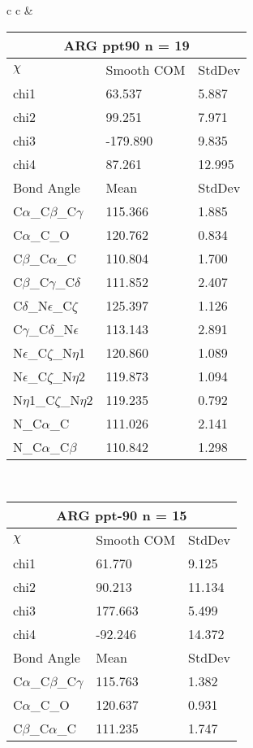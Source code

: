 \begin{longtable}{ c c }
  &
  \begin{tabular}{ l l l }
  \toprule
  \multicolumn{3}{c}{ARG \textbf{ppt90} n = 19} \\ \toprule
  $\chi$       & Smooth COM & StdDev \\ \midrule
  chi1 & 63.537 & 5.887 \\ 
  chi2 & 99.251 & 7.971 \\ 
  chi3 & -179.890 & 9.835 \\ 
  chi4 & 87.261 & 12.995 \\ \midrule
  Bond Angle   & Mean     & StdDev \\ \midrule
  C$\alpha$\_C$\beta$\_C$\gamma$ & 115.366 & 1.885\\
  C$\alpha$\_C\_O & 120.762 & 0.834\\
  C$\beta$\_C$\alpha$\_C & 110.804 & 1.700\\
  C$\beta$\_C$\gamma$\_C$\delta$ & 111.852 & 2.407\\
  C$\delta$\_N$\epsilon$\_C$\zeta$ & 125.397 & 1.126\\
  C$\gamma$\_C$\delta$\_N$\epsilon$ & 113.143 & 2.891\\
  N$\epsilon$\_C$\zeta$\_N$\eta$1 & 120.860 & 1.089\\
  N$\epsilon$\_C$\zeta$\_N$\eta$2 & 119.873 & 1.094\\
  N$\eta$1\_C$\zeta$\_N$\eta$2 & 119.235 & 0.792\\
  N\_C$\alpha$\_C & 111.026 & 2.141\\
  N\_C$\alpha$\_C$\beta$ & 110.842 & 1.298\\
  \bottomrule
  \end{tabular}
  \\
  \begin{tabular}{ l l l }
  \toprule
  \multicolumn{3}{c}{ARG \textbf{ppt-90} n = 15} \\ \toprule
  $\chi$       & Smooth COM & StdDev \\ \midrule
  chi1 & 61.770 & 9.125 \\ 
  chi2 & 90.213 & 11.134 \\ 
  chi3 & 177.663 & 5.499 \\ 
  chi4 & -92.246 & 14.372 \\ \midrule
  Bond Angle   & Mean     & StdDev \\ \midrule
  C$\alpha$\_C$\beta$\_C$\gamma$ & 115.763 & 1.382\\
  C$\alpha$\_C\_O & 120.637 & 0.931\\
  C$\beta$\_C$\alpha$\_C & 111.235 & 1.747\\

\end{tabular}
\end{longtable}
